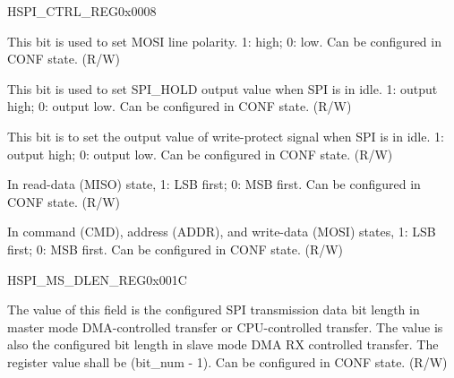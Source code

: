 \begin{register}{H}{SPI\_CTRL\_REG}{0x0008}
\begin{regdesc}
\begin{reglist}
\label{fielddesc:SPIDPOL}\item [SPI\_D\_POL] This bit is used to set MOSI line polarity. 1: high; 0: low. Can be configured in CONF state. (R/W)
\label{fielddesc:SPIHOLDPOL}\item [SPI\_HOLD\_POL] This bit is used to set SPI\_HOLD output value when SPI is in idle. 1: output high; 0: output low. Can be configured in CONF state. (R/W)
\label{fielddesc:SPIWPPOL}\item [SPI\_WP\_POL] This bit is to set the output value of write-protect signal when SPI is in idle. 1: output high; 0: output low. Can be configured in CONF state. (R/W)
\label{fielddesc:SPIRDBITORDER}\item [SPI\_RD\_BIT\_ORDER] In read-data (MISO) state, 1: LSB first; 0: MSB first. Can be configured in CONF state. (R/W)
\label{fielddesc:SPIWRBITORDER}\item [SPI\_WR\_BIT\_ORDER] In command (CMD), address (ADDR), and write-data (MOSI) states, 1: LSB first; 0: MSB first. Can be configured in CONF state. (R/W)
\end{reglist}\end{regdesc}
\end{register}


\begin{register}{H}{SPI\_MS\_DLEN\_REG}{0x001C}\label{regdesc:SPIMSDLENREG}
%
%
\regnewline%
\begin{regdesc}\begin{reglist}
\label{fielddesc:SPIMSDATABITLEN}\item [SPI\_MS\_DATA\_BITLEN] The value of this field is the configured SPI transmission data bit length in master mode DMA-controlled transfer or CPU-controlled transfer. The value is also the configured bit length in slave mode DMA RX controlled transfer. The register value shall be (bit\_num - 1). Can be configured in CONF state. (R/W)
\end{reglist}\end{regdesc}
\end{register}


